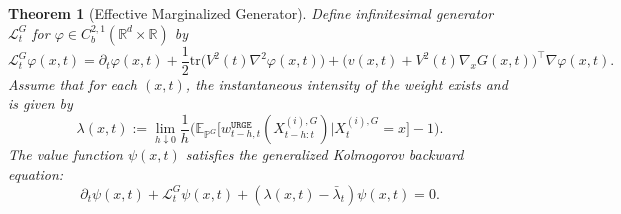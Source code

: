 \documentclass{article}
\theoremstyle{plain}
\newtheorem{theorem}{Theorem}[section]
\theoremstyle{definition}
\theoremstyle{remark}
\newcommand{\R}{{\mathbb{R}}}
\begin{document}
\begin{theorem}[Effective Marginalized Generator]
    Define infinitesimal generator $\mathcal L^G_t$ for $\varphi\in C_b^{2,1}(\R^d\times \R)$ by 
    \[
    \mathcal L^G_t\varphi(x,t) = \partial_t \varphi(x,t)+ \frac{1}{2} \mathrm{tr}\big(V^2(t) \nabla^2 \varphi(x,t)\big) + \big(v(x,t)+V^2(t)\nabla_x G(x,t)\big)^\top \nabla\varphi(x,t).
    \]
Assume that for each $(x,t)$, the instantaneous intensity of the weight exists and is given by \[\lambda(x,t) := \lim_{h \downarrow 0} \dfrac{1}{h}\Bigg(\mathbb{E}_{\mathbb{P}^G}\Big[w^{\texttt{URGE}}_{t-h,t}(X^{(i),G}_{t-h:t})\Big| X_t^{(i),G}=x \Big] - 1\Bigg).\]
The value function $\psi(x,t)$ satisfies the generalized Kolmogorov backward equation:
\[
\partial_t \psi(x,t) + \mathcal L^G_t \psi(x,t) + (\lambda(x,t)-\bar\lambda_t)\psi(x,t) = 0.
\]
\end{theorem}
\end{document}
